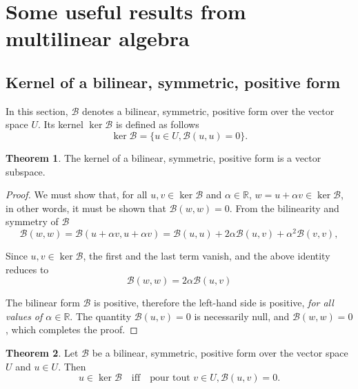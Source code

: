 \documentclass[12pt, final]{scrartcl}
\theoremstyle{definition}
\newtheorem{theorem}{Theorem}
\newcommand{\reals}{\mathbb{R}}
\begin{document}
\appendix

\section{Some useful results from multilinear algebra}

\subsection{Kernel of a bilinear, symmetric, positive form}

In this section, $\mathcal{B}$ denotes a bilinear, symmetric, positive form over the vector space $U$. Its kernel
$\ker \mathcal{B}$ is defined as follows
\begin{equation}
 \ker \mathcal{B}= \bigl\{ u \in U, \mathcal{B}(u, u) = 0 \bigr\} .
\end{equation}

\begin{theorem}
  The kernel of a bilinear, symmetric, positive form is a vector subspace.
\end{theorem}
\begin{proof}
  We must show that, for all $u, v \in\ker \mathcal{B}$ and $\alpha \in \reals$,
  $w = u + \alpha v \in \ker \mathcal{B}$, in other words, it must be shown that $\mathcal{B}(w, w) = 0$. From the
  bilinearity and symmetry of $\mathcal{B}$
 \begin{equation*}
   \mathcal{B}(w, w) = \mathcal{B}(u + \alpha v, u + \alpha v)
   = \mathcal{B}(u, u) + 2 \alpha \mathcal{B}(u, v) + \alpha^2 \mathcal{B}(v, v),
 \end{equation*}

 Since $u, v \in \ker\mathcal{B}$, the first and the last term vanish, and the above identity reduces to
 \begin{equation*}
   \mathcal{B}(w, w) = 2\alpha \mathcal{B}(u, v)
 \end{equation*}

 The bilinear form $\mathcal{B}$ is positive, therefore the left-hand side is positive, \emph{for all values of
   $\alpha \in \reals$}. The quantity $\mathcal{B}(u, v) = 0$ is necessarily null, and $\mathcal{B}(w, w) = 0$, which
 completes the proof.
\end{proof}

\begin{theorem}
  Let $\mathcal{B}$ be a bilinear, symmetric, positive form over the vector space $U$ and $u \in U$. Then
 \begin{equation*}
  u \in \ker\mathcal{B} \quad \text{iff} \quad \text{pour tout } v \in U, \mathcal{B}(u, v) = 0.
 \end{equation*}
\end{theorem}
\end{document}
